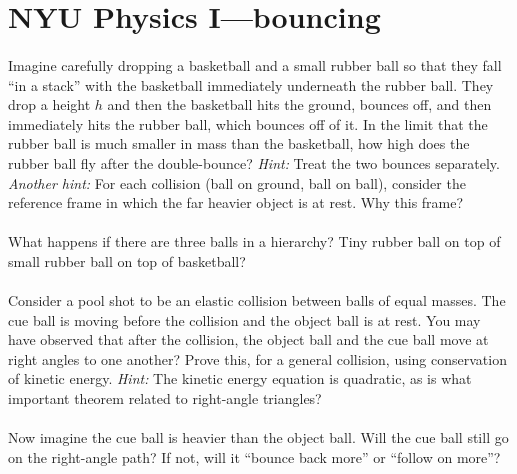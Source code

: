 \documentclass[12pt]{article}
\begin{document}
\section*{NYU Physics I---bouncing}

\paragraph{\theproblem}%
Imagine carefully dropping a basketball and a small rubber ball so
that they fall ``in a stack'' with the basketball immediately
underneath the rubber ball.  They drop a height $h$ and then the
basketball hits the ground, bounces off, and then immediately hits the
rubber ball, which bounces off of it.  In the limit that the rubber
ball is much smaller in mass than the basketball, how high does the
rubber ball fly after the double-bounce?  \emph{Hint:} Treat the two
bounces separately. \emph{Another hint:} For each collision (ball on ground, ball on ball),
consider the reference frame
in which the far heavier object is at rest. Why this frame?

\paragraph{\theproblem}%
What happens if there are three balls in a hierarchy?  Tiny rubber
ball on top of small rubber ball on top of basketball?

\paragraph{\theproblem}%
Consider a pool shot to be an elastic collision between balls of equal
masses.  The cue ball is moving before the collision and the object
ball is at rest.  You may have observed that after the collision, the
object ball and the cue ball move at right angles to one another?
Prove this, for a general collision, using conservation of kinetic
energy.  \emph{Hint:} The kinetic energy equation is quadratic, as is
what important theorem related to right-angle triangles?

\paragraph{\theproblem}%
Now imagine the cue ball is heavier than the object ball.  Will the
cue ball still go on the right-angle path?  If not, will it ``bounce
back more'' or ``follow on more''?
\end{document}
